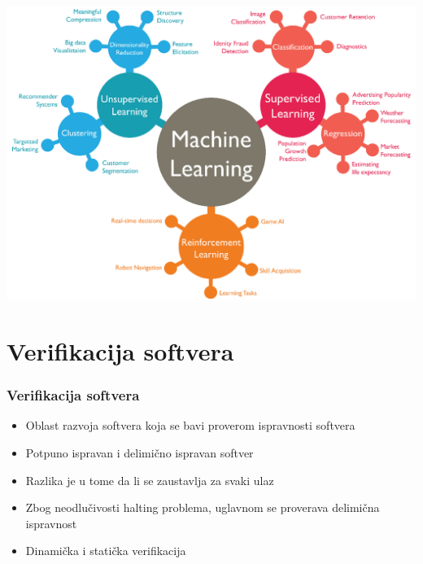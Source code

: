 \documentclass[11pt]{beamer}
\theoremstyle{definition}
\begin{document}
{
\begin{frame}{}
 	\begin{center}
         	\includegraphics[width=\textwidth,height=0.9\textheight,keepaspectratio]{machine-learning.png}
        \end{center}
\end{frame}


\section{Verifikacija softvera}
\label{sec:verifikacija}
\begin{frame}
\frametitle{Verifikacija softvera}
\begin{itemize}
\item Oblast razvoja softvera koja se bavi proverom ispravnosti softvera
\item Potpuno ispravan i delimično ispravan softver
\item Razlika je u tome da li se zaustavlja za svaki ulaz
\item Zbog neodlučivosti halting problema, uglavnom se proverava delimična ispravnost
\item Dinamička i statička verifikacija
\end{itemize}
\end{frame}

}
\end{document}
